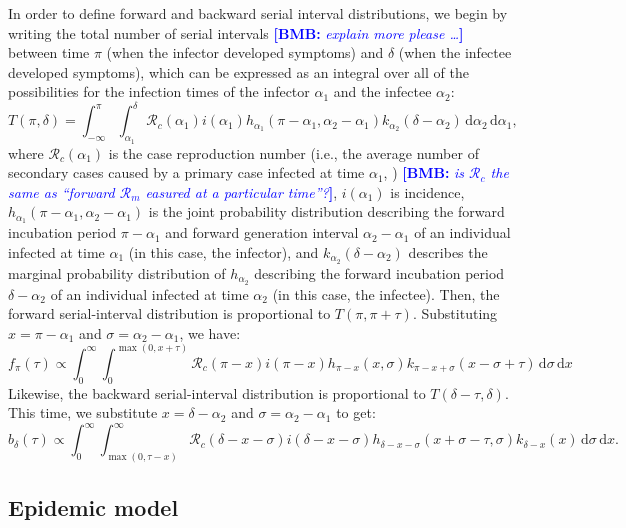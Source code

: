 \documentclass[12pt]{article}
\newcommand{\comment}{\showcomment}
\newcommand{\showcomment}[3]{\textcolor{#1}{\textbf{[#2: }\textsl{#3}\textbf{]}}}
\newcommand{\bmb}[1]{\comment{blue}{BMB}{#1}}
\newcommand{\Rx}[1]{\ensuremath{{\mathcal R}_{#1}}\xspace}
\newcommand{\Rc}{\Rx{c}}
\newcommand{\dd}[1]{\ensuremath{\, \mathrm{d}#1}}
\newcommand{\dx}{\dd{x}}
\newcommand{\dsigma}{\dd{\sigma}}
\begin{document}
In order to define forward and backward serial interval distributions, we begin by writing the total number of serial intervals \bmb{explain more please \ldots} between time $\pi$ (when the infector developed symptoms) and $\delta$ (when the infectee developed symptoms), which can be expressed as an integral over all of the possibilities for the infection times of the infector $\alpha_1$ and the infectee $\alpha_2$:
\begin{equation}
T(\pi,\delta) = \int_{-\infty}^{\pi} \int_{\alpha_1}^{\delta} \Rc (\alpha_1) i(\alpha_1) h_{\alpha_1}(\pi-\alpha_1, \alpha_2 - \alpha_1) k_{\alpha_2}(\delta - \alpha_2) \, \mathrm{d}\alpha_2\,\mathrm{d}\alpha_1,
\end{equation}
where $\Rc(\alpha_1)$ is the case reproduction number (i.e., the average number of secondary cases caused by a primary case infected at time $\alpha_1$, \cite{fraser2007estimating}) \bmb{is \Rc the same as ``forward \Rx measured at a particular time''?}, $i(\alpha_1)$ is incidence, $h_{\alpha_1}(\pi-\alpha_1, \alpha_2 - \alpha_1)$ is the joint probability distribution describing the forward incubation period $\pi-\alpha_1$ and forward generation interval $\alpha_2 - \alpha_1$ of an individual infected at time $\alpha_1$ (in this case, the infector), and $k_{\alpha_2}(\delta-\alpha_2)$ describes the marginal probability distribution of $h_{\alpha_2}$ describing the forward incubation period $\delta-\alpha_2$ of an individual infected at time $\alpha_2$ (in this case, the infectee). 
Then, the forward serial-interval distribution is proportional to $T(\pi, \pi+\tau)$. Substituting $x=\pi-\alpha_1$ and $\sigma=\alpha_2-\alpha_1$, we have:
\begin{equation}
f_\pi(\tau) \propto \int_{0}^{\infty} \int_{0}^{\max(0,x+\tau)} \Rc (\pi-x) i(\pi-x) h_{\pi-x}(x, \sigma) k_{\pi-x+\sigma}(x-\sigma+\tau) \dsigma \dx
\end{equation}
Likewise, the backward serial-interval distribution is proportional to $T(\delta-\tau, \delta)$. 
This time, we substitute $x=\delta-\alpha_2$ and $\sigma=\alpha_2-\alpha_1$ to get:
\begin{equation}
b_\delta(\tau) \propto \int_{0}^{\infty} \int_{\max(0, \tau-x)}^{\infty} \Rc (\delta-x-\sigma) i(\delta-x-\sigma) h_{\delta-x-\sigma}(x+\sigma-\tau, \sigma) k_{\delta-x}(x) \dsigma \dx.
\end{equation}

\subsection{Epidemic model}
\end{document}
